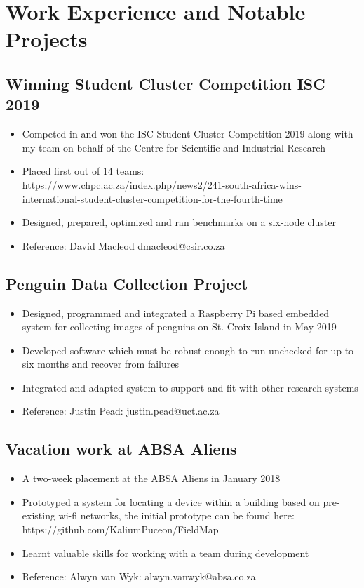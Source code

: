 \documentclass[12pt,a4paper,notitlepage]{article}
\begin{document}
\section*{Work Experience and Notable Projects}

\subsection*{Winning Student Cluster Competition ISC 2019}
\begin{itemize}
	\setlength\itemsep{0.02em}
    \item Competed in and won the ISC Student Cluster Competition 2019 along with my team on behalf of the Centre for Scientific and Industrial Research
    \item Placed first out of 14 teams:\\https://www.chpc.ac.za/index.php/news2/241-south-africa-wins-international-student-cluster-competition-for-the-fourth-time
    \item Designed, prepared, optimized and ran benchmarks on a six-node cluster
    \item Reference: David Macleod dmacleod@csir.co.za
\end{itemize}

\subsection*{Penguin Data Collection Project}
\begin{itemize}
	\setlength\itemsep{0.02em}
    \item Designed, programmed and integrated a Raspberry Pi based embedded system for collecting images of penguins on St. Croix Island in May 2019
    \item Developed software which must be robust enough to run unchecked for up to six months and recover from failures
    \item Integrated and adapted system to support and fit with other research systems
    \item Reference: Justin Pead: justin.pead@uct.ac.za
\end{itemize}

\subsection*{Vacation work at ABSA Aliens}
\begin{itemize}
	\setlength\itemsep{0.02em}
    \item A two-week placement at the ABSA Aliens in January 2018
    \item Prototyped a system for locating a device within a building based on pre-existing wi-fi networks, the initial prototype can be found here:\\https://github.com/KaliumPuceon/FieldMap
    \item Learnt valuable skills for working with a team during development
    \item Reference: Alwyn van Wyk: alwyn.vanwyk@absa.co.za
\end{itemize}
\end{document}
